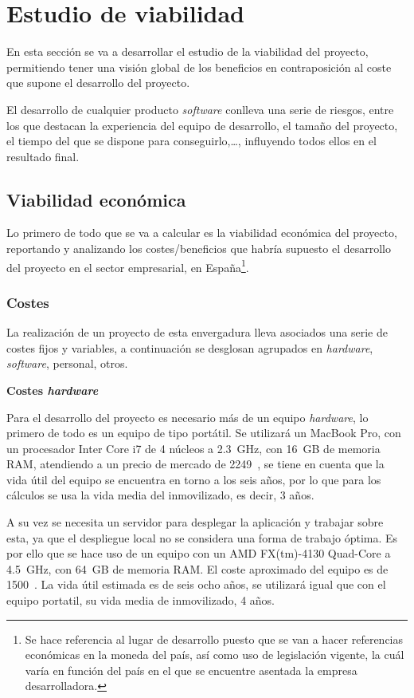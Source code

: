 \newpage
\section{Estudio de viabilidad}
En esta sección se va a desarrollar el estudio de la viabilidad del proyecto, permitiendo tener una visión global de los beneficios en contraposición al coste que supone el desarrollo del proyecto.

El desarrollo de cualquier producto \textit{software} conlleva una serie de riesgos, entre los que destacan la experiencia del equipo de desarrollo, el tamaño del proyecto, el tiempo del que se dispone para conseguirlo,\dots, influyendo todos ellos en el resultado final.
\subsection{Viabilidad económica}
Lo primero de todo que se va a calcular es la viabilidad económica del proyecto, reportando y analizando los costes/beneficios que habría supuesto el desarrollo del proyecto en el sector empresarial, en España\footnote{Se hace referencia al lugar de desarrollo puesto que se van a hacer referencias económicas en la moneda del país, así como uso de legislación vigente, la cuál varía en función del país en el que se encuentre asentada la empresa desarrolladora.}.

\subsubsection{Costes}
La realización de un proyecto de esta envergadura lleva asociados una serie de costes fijos y variables, a continuación se desglosan agrupados en \textit{hardware}, \textit{software}, personal, otros.

\textbf{Costes \textit{hardware}}

Para el desarrollo del proyecto es necesario más de un equipo \textit{hardware}, lo primero de todo es un equipo de tipo portátil. Se utilizará un MacBook Pro, con un procesador Inter Core i7 de 4 núcleos a 2.3~GHz, con 16~GB de memoria RAM, atendiendo a un precio de mercado de 2249~\officialeuro, se tiene en cuenta que la vida útil del equipo se encuentra en torno a los seis años, por lo que para los cálculos se usa la vida media del inmovilizado, es decir, 3 años. 

A su vez se necesita un servidor para desplegar la aplicación y trabajar sobre esta, ya que el despliegue local no se considera una forma de trabajo óptima. Es por ello que se hace uso de un equipo con un AMD FX(tm)-4130 Quad-Core a 4.5~GHz, con 64~GB de memoria RAM. El coste aproximado del equipo es de 1500~\officialeuro. La vida útil estimada es de seis ocho años, se utilizará igual que con el equipo portatil, su vida media de inmovilizado, 4 años.

